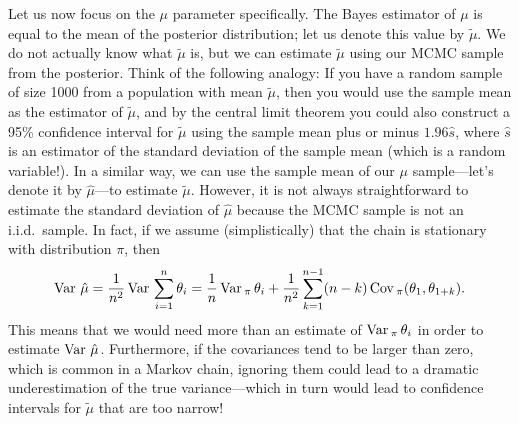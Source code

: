 \documentclass{article}
\def\Var{\mathop{\rm Var\,}\nolimits}
\def\Cov{\mathop{\rm Cov\,}\nolimits}
\begin{document}
Let us now focus on the $\mu$ parameter specifically.  The Bayes estimator of $\mu$ is equal to 
the mean of the posterior distribution; let us denote this value by $\tilde\mu$.  We do not actually
know what $\tilde\mu$ is, but we can estimate $\tilde\mu$ using our MCMC sample from the posterior.
Think of the following analogy:  If you have a random sample of size 1000 from a population with
mean $\tilde\mu$, then you would use the sample mean as the estimator of $\tilde\mu$, and by 
the central limit theorem you could also construct a 95\% confidence interval for $\tilde\mu$
using the sample mean plus or minus $1.96\hat s$, where $\hat s$ is an estimator of the
standard deviation of the sample mean (which is a random variable!).  In a similar way, we can use 
the sample mean of our $\mu$ sample---let's denote it by $\hat\mu$---to 
estimate $\tilde\mu$.  However, it is not always 
straightforward to estimate the standard deviation of  $\hat\mu$ because the MCMC sample is
not an i.i.d.~sample.  In fact, if we assume (simplistically) 
that the chain is stationary with distribution $\pi$, then
\[
\Var \hat\mu = \frac1 {n^2} \Var \sum_{i=1}^n \theta_i = 
\frac1n \Var_\pi \theta_i + \frac1{n^2} \sum_{k=1}^{n-1} (n-k) \Cov_\pi (\theta_1, \theta_{1+k}).
\]
This means that we would need more than an estimate of $\Var_\pi\theta_i$ in order to
estimate $\Var \hat\mu$.  Furthermore, if the covariances tend to be larger than zero, 
which is common in a Markov chain, ignoring them could lead to a dramatic underestimation
of the true variance---which in turn would lead to confidence intervals for $\tilde\mu$ that are 
too narrow!
\end{document}
